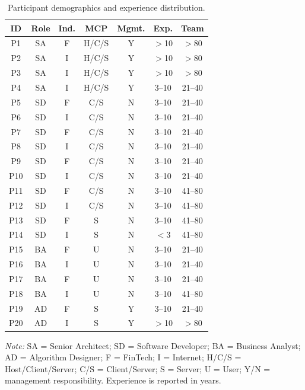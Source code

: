 \begin{table}[!t]
\centering
\caption{Participant demographics and experience distribution.}
\label{tab:participants}
\scriptsize
\renewcommand{\arraystretch}{1.05}
\setlength{\tabcolsep}{1.6pt}
\begin{tabular}{@{}c c c c c c c@{}}
\toprule
\textbf{ID} & \textbf{Role} & \textbf{Ind.} & \textbf{MCP} & \textbf{Mgmt.} & \textbf{Exp.} & \textbf{Team} \\
\midrule
P1  & SA & F & H/C/S & Y & $>$10 & $>$80 \\
P2  & SA & I & H/C/S & Y & $>$10 & $>$80 \\
P3  & SA & I & H/C/S & Y & $>$10 & $>$80 \\
P4  & SA & I & H/C/S & Y & 3--10 & 21--40 \\
P5  & SD & F & C/S   & N & 3--10 & 21--40 \\
P6  & SD & I & C/S   & N & 3--10 & 21--40 \\
P7  & SD & F & C/S   & N & 3--10 & 21--40 \\
P8  & SD & I & C/S   & N & 3--10 & 21--40 \\
P9  & SD & F & C/S   & N & 3--10 & 21--40 \\
P10 & SD & I & C/S   & N & 3--10 & 21--40 \\
P11 & SD & F & C/S   & N & 3--10 & 41--80 \\
P12 & SD & I & C/S   & N & 3--10 & 41--80 \\
P13 & SD & F & S     & N & 3--10 & 41--80 \\
P14 & SD & I & S     & N & $<$3 & 41--80 \\
P15 & BA & F & U     & N & 3--10 & 21--40 \\
P16 & BA & I & U     & N & 3--10 & 21--40 \\
P17 & BA & F & U     & N & 3--10 & 21--40 \\
P18 & BA & I & U     & N & 3--10 & 41--80 \\
P19 & AD & F & S     & Y & 3--10 & 21--40 \\
P20 & AD & I & S     & Y & $>$10 & $>$80 \\
\bottomrule
\end{tabular}
\vspace{0.35em}
\parbox{\columnwidth}{\scriptsize\raggedright
\textit{Note:} SA = Senior Architect; SD = Software Developer; BA = Business Analyst; AD = Algorithm Designer; F = FinTech; I = Internet; H/C/S = Host/Client/Server; C/S = Client/Server; S = Server; U = User; Y/N = management responsibility. Experience is reported in years.}
\end{table}


